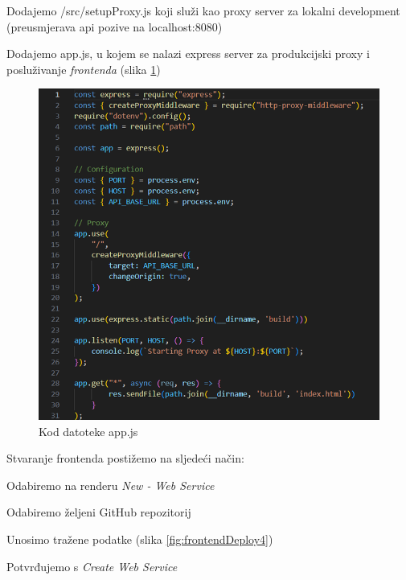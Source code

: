 \begin{packed_item}
				\item Dodajemo /src/setupProxy.js koji služi kao proxy server za lokalni development (preusmjerava api pozive na localhost:8080)
				\item Dodajemo app.js, u kojem se nalazi express server za produkcijski proxy i posluživanje \textit{frontenda} (slika \ref{fig:frontendDeploy3})
			
			\begin{figure}[H]
				\includegraphics[scale=1]{slike/frontendDeploy3.png}
				\centering
				\caption{Kod datoteke app.js}
				\label{fig:frontendDeploy3}
			\end{figure}

			Stvaranje frontenda postižemo na sljedeći način:
			\begin{packed_item}
				\item Odabiremo na renderu \textit{New - Web Service}
				\item Odabiremo željeni GitHub repozitorij
				\item Unosimo tražene podatke (slika \ref{fig:frontendDeploy4})
				\item Potvrđujemo s \textit{Create Web Service}
			\end{packed_item}


\end{packed_item}
